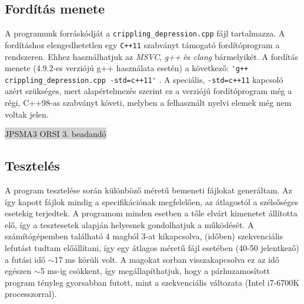 \documentclass[12pt]{article}
\begin{document}
\subsection{Fordítás menete}
A programunk forráskódját a \verb|crippling_depression.cpp| fájl tartalmazza. A fordításhoz
elengedhetetlen egy \verb|C++11| szabványt támogató fordítóprogram a rendszeren. Ehhez
használhatjuk az \textit{MSVC}, \textit{g++} és \textit{clang} bármelyikét. A fordítás menete
(4.9.2-es verziójú g++ használata esetén) a következő: \verb|'g++ crippling_depression.cpp -std=c++11'|
. A speciális, \verb|-std=c++11| kapcsoló azért szükséges, mert alapértelmezés
szerint ez a verziójú fordítóprogram még a régi, C++98-as szabványt követi, melyben a
felhasznált nyelvi elemek még nem voltak jelen.

\newpage
\thispagestyle{empty}
\begin{center}
	\colorbox{lightgray}{{\large JPSMA3} \hspace{4.3cm} {\large ORSI 3. beadandó} \hspace{5.7cm} \thepage}
\end{center}

\subsection{Tesztelés}
A program tesztelése során különböző méretű bemeneti fájlokat generáltam. Az így kapott
fájlok mindig a specifikációnak megfelelően, az átlagostól a szélsőséges esetekig terjedtek.
A programom minden esetben a tőle elvárt kimenetet állította elő, így a tesztesetek alapján
helyesnek gondolhatjuk a működését.\br
A számítógépemben található 4 magból 3-at kikapcsolva, (időben) szekvenciális lefutást tudtam 
előállítani, így egy átlagos méretű fájl esetében (40-50 jelentkező) a futási idő $\sim$17 ms
körüli volt. A magokat sorban visszakapcsolva ez az idő egészen $\sim$5 ms-ig csökkent,
így megállapíthatjuk, hogy a párhuzamosított program tényleg gyorsabban futott, mint a
szekvenciális változata (Intel i7-6700K processzorral).
\end{document}
